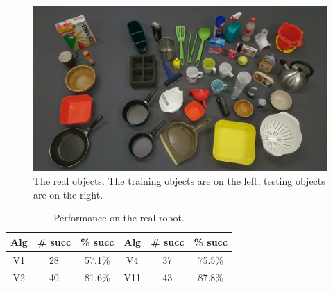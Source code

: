 
\begin{figure}[t]
\begin{center}
  \includegraphics[width=0.9\linewidth]{images/objects.jpg}
  \end{center}
  \caption{The real objects. The training objects are on the left, testing objects are on the right.}
  \label{fig:real-objects}
\end{figure}

\begin{table}[b]
\begin{center}
\caption{Performance on the real robot. \label{tab:robot-results}}
\begin{tabular}{|c|c|c|c|c|c|} \hline
Alg & \# succ & \% succ & Alg & \# succ & \% succ \\ \hline
V1  &  28 & 57.1\% & V4   & 37  & 75.5\% \\
V2  & 40 & 81.6\% & V11 & 43  & 87.8\% \\
\hline
\end{tabular}
\end{center}
\end{table}

